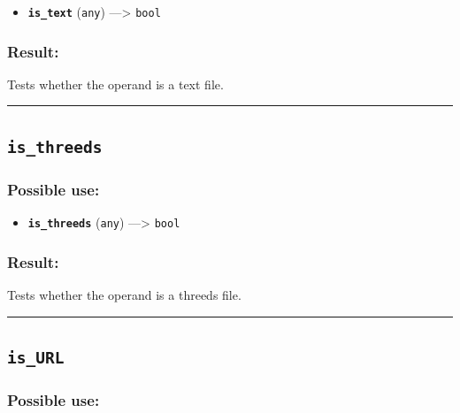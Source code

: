 \documentclass[]{book}
\providecommand{\tightlist}{%
  \setlength{\itemsep}{0pt}\setlength{\parskip}{0pt}}
\theoremstyle{definition}
\theoremstyle{definition}
\theoremstyle{definition}
\theoremstyle{remark}
\begin{document}
\begin{itemize}
\tightlist
\item
  \textbf{\texttt{is\_text}} (\texttt{any}) ---\textgreater{}
  \texttt{bool}
\end{itemize}

\subsubsection{Result:}\label{result-295}

Tests whether the operand is a text file.

\begin{center}\rule{0.5\linewidth}{\linethickness}\end{center}

\subsection{\texorpdfstring{\texttt{is\_threeds}}{is\_threeds}}\label{is_threeds}

\subsubsection{Possible use:}\label{possible-use-306}

\begin{itemize}
\tightlist
\item
  \textbf{\texttt{is\_threeds}} (\texttt{any}) ---\textgreater{}
  \texttt{bool}
\end{itemize}

\subsubsection{Result:}\label{result-296}

Tests whether the operand is a threeds file.

\begin{center}\rule{0.5\linewidth}{\linethickness}\end{center}

\subsection{\texorpdfstring{\texttt{is\_URL}}{is\_URL}}\label{is_url}

\subsubsection{Possible use:}\label{possible-use-307}
\end{document}
